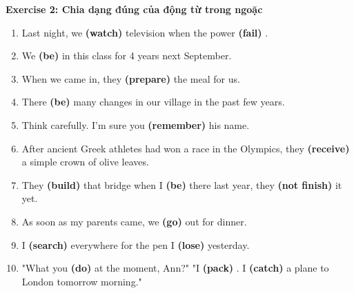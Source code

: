 \documentclass[12pt,a4paper,twoside]{article}
\begin{document}
\begin{groupbox}\textbf{\large Exercise 2: Chia dạng đúng của động từ trong ngoặc}\end{groupbox}
\begin{enumerate}[label=\textbf{\arabic*.}, leftmargin=2em, itemsep=6pt, topsep=4pt]
\item Last night, we \textbf{(watch)} \underline{\hspace{1.3cm}} television when the power \textbf{(fail)} \underline{\hspace{1.3cm}}.
\item We \textbf{(be)} \underline{\hspace{1.3cm}} in this class for 4 years next September.
\item When we came in, they \textbf{(prepare)} \underline{\hspace{1.3cm}} the meal for us.
\item There \textbf{(be)} \underline{\hspace{1.3cm}} many changes in our village in the past few years.
\item Think carefully. I'm sure you \textbf{(remember)} \underline{\hspace{1.3cm}} his name.
\item After ancient Greek athletes had won a race in the Olympics, they \textbf{(receive)} \underline{\hspace{1.3cm}} a simple crown of olive leaves.
\item They \textbf{(build)} \underline{\hspace{1.3cm}} that bridge when I \textbf{(be)} \underline{\hspace{1.3cm}} there last year, they \textbf{(not finish)} \underline{\hspace{1.3cm}} it yet.
\item As soon as my parents came, we \textbf{(go)} \underline{\hspace{1.3cm}} out for dinner.
\item I \textbf{(search)} \underline{\hspace{1.3cm}} everywhere for the pen I \textbf{(lose)} \underline{\hspace{1.3cm}} yesterday.
\item "What you \textbf{(do)} \underline{\hspace{1.3cm}} at the moment, Ann?" "I \textbf{(pack)} \underline{\hspace{1.3cm}}. I \textbf{(catch)} \underline{\hspace{1.3cm}} a plane to London tomorrow morning."

\end{enumerate}
\end{document}
